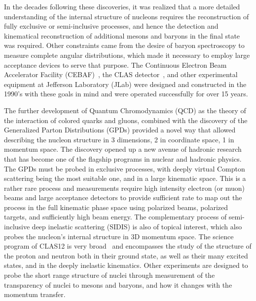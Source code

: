 \documentclass[final,3p,twocolumn]{elsarticle}
\begin{document}
In the decades following these discoveries, it was realized that a more detailed understanding of the internal
structure of nucleons requires the reconstruction of fully exclusive or semi-inclusive processes, and hence the
detection and kinematical reconstruction of additional mesons and baryons in the final state was required.  Other
constraints came from the desire of baryon spectroscopy to measure complete angular distributions, which made it
necessary to employ large acceptance devices to serve that purpose. The Continuous Electron Beam Accelerator
Facility (CEBAF)~\cite{Leemann:2001dg}, the CLAS detector~\cite{Mecking:2003zu}, and other experimental
equipment at Jefferson Laboratory (JLab) were designed and constructed in the 1990's with these goals in mind and
were operated successfully for over 15 years. 

The further development of Quantum Chromodynamics (QCD) as the theory of the interaction of colored quarks and
gluons, combined with the discovery of the Generalized Parton Distributions (GPDs) provided a novel way that allowed
describing the nucleon structure in 3 dimensions, 2 in coordinate space, 1 in momentum space. The discovery opened up
a new avenue of hadronic research that has become one of the flagship programs in nuclear and hadronic physics. The
GPDs must be probed in exclusive processes, with deeply virtual Compton scattering being the most suitable one, and
in a large kinematic space. This is a rather rare process and measurements require high intensity electron (or muon)
beams and large acceptance detectors to provide sufficient rate to map out the process in the full kinematic phase
space using polarized beams, polarized targets, and sufficiently high beam energy. The complementary process of
semi-inclusive deep inelastic scattering (SIDIS) is also of topical interest,  which also probes the nucleon's internal
structure in 3D momentum space. The science program of CLAS12 is very broad~\cite{Burkert:2018nvj} and encompasses
the study of the structure of the proton and neutron both in their ground state, as well as their many excited states, and
in the deeply inelastic kinematics. Other experiments are designed to probe the short range structure of nuclei through
measurement of the transparency of nuclei to mesons and baryons, and how it changes with the momentum transfer.   
\end{document}
